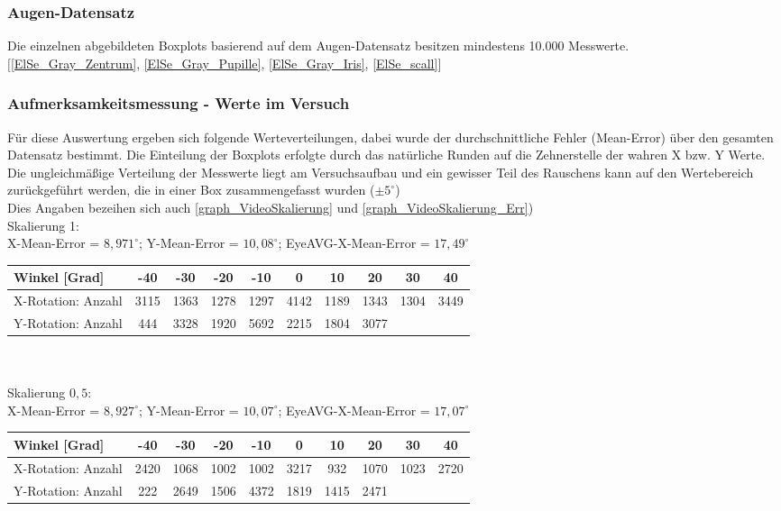 \subsubsection{Augen-Datensatz \cite{database_Eye}}
Die einzelnen abgebildeten Boxplots basierend auf dem Augen-Datensatz \cite{database_Eye} besitzen mindestens 10.000 Messwerte.\\
$[$\autoref{ElSe_Gray_Zentrum}, \autoref{ElSe_Gray_Pupille}, \autoref{ElSe_Gray_Iris}, \autoref{ElSe_scall}$]$
\subsubsection{Aufmerksamkeitsmessung - Werte im Versuch}
Für diese Auswertung ergeben sich folgende Werteverteilungen, dabei wurde der durchschnittliche Fehler (Mean-Error) über den gesamten Datensatz bestimmt. Die Einteilung der Boxplots erfolgte durch das natürliche Runden auf die Zehnerstelle der wahren X bzw. Y Werte. Die ungleichmäßige Verteilung der Messwerte liegt am Versuchsaufbau und ein gewisser Teil des Rauschens kann auf den Wertebereich zurückgeführt werden, die in einer Box zusammengefasst wurden ($\pm 5^\circ$)\\
Dies Angaben bezeihen sich auch  \autoref{graph_VideoSkalierung} und \autoref{graph_VideoSkalierung_Err})\\
Skalierung 1:\\
X-Mean-Error = $8,971^\circ$; Y-Mean-Error = $10,08^\circ$; EyeAVG-X-Mean-Error = $17,49^\circ$\\
\begin{tabular}{|l|c|c|c|c|c|c|c|c|c|}
	\hline 
	Winkel [Grad]&-40&-30&-20&-10&0&10&20&30&40\\
	\hline 
	X-Rotation: Anzahl&3115&1363&1278&1297&4142&1189&1343&1304&3449\\ 
	\hline 
	Y-Rotation: Anzahl&444&3328&1920&5692&2215&1804&3077&&\\
	\hline
\end{tabular}\\\\
Skalierung $0,5$:\\
X-Mean-Error = $8,927^\circ$; Y-Mean-Error = $10,07^\circ$; EyeAVG-X-Mean-Error = $17,07^\circ$\\
\begin{tabular}{|l|c|c|c|c|c|c|c|c|c|}
	\hline 
	Winkel [Grad]&-40&-30&-20&-10&0&10&20&30&40\\
	\hline 
	X-Rotation: Anzahl&2420&1068&1002&1002&3217&932&1070&1023&2720\\ 
	\hline 
	Y-Rotation: Anzahl&222&2649&1506&4372&1819&1415&2471&&\\
	\hline
\end{tabular}\\\\
